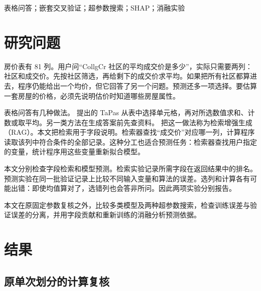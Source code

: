 \documentclass[12pt,journal,onecolumn,a4paper]{IEEEtran}
\begin{document}
\begin{abstract}
TableLab 在本地检索字段说明，通过 DeepSeek API 生成分析方案，再由本机程序完成统计与模型训练。字段检索检查限于 16 道固定题，其中 15 道含英文字段名；DeepSeek API 的方案生成质量尚未评价。本文用房价、收入分类、NBA 得分和学生成绩四个任务比较九种预设方法，并对森林与梯度提升分别进行网格和 TPE 搜索。外层三折评价训练流程，内层三折选择参数；训练与验证曲线检查拟合差距，SHAP 和重新调参的特征组消融检查模型依赖。房价的较小平均 RMSE 为 32,338.23 美元，来自提升树＋网格；收入分类中，提升树＋网格的 AUC 为 0.8913。NBA 得分由随机森林取得较小平均误差（5.698 分），学生成绩则是 Ridge（13.545 分）。各任务的较优方法与搜索收益不同，解释和消融结果也需结合字段之间的替代关系判断。
\end{abstract}
\renewcommand{\IEEEkeywordsname}{关键词}
\begin{IEEEkeywords}表格问答；嵌套交叉验证；超参数搜索；SHAP；消融实验\end{IEEEkeywords}
\clearpage\tableofcontents\clearpage
\section{研究问题}


房价表有 81 列。用户问“CollgCr 社区的平均成交价是多少”，实际只需要两列：社区和成交价。先按社区筛选，再给剩下的成交价求平均。如果把所有社区都算进去，程序仍能给出一个均价，但它回答了另一个问题。预测还多一项选择。要估算一套房屋的价格，必须先说明估价时知道哪些房屋属性。

表格问答有几种做法。\citet{herzig2020} 提出的 TaPas 从表中选择单元格，再对所选数值求和、计数或取平均。另一类方法在生成答案前先查资料。\citet{lewis2020} 把这一做法称为检索增强生成（RAG）。本文把检索用于字段说明。检索器查找“成交价”对应哪一列，计算程序读取该列中符合条件的全部记录。这种分工也适合预测任务：检索器查找用户指定的变量，统计程序用这些变量重新拟合模型。

本文分别检查字段检索和模型预测。检索实验记录所需字段在返回结果中的排名。预测实验在同一批验证记录上比较不同输入变量和算法的误差。选列和计算各有可能出错：即使均值算对了，选错列也会答非所问。因此两项实验分别报告。


本文在原固定参数复核之外，比较多类模型及两种超参数搜索，检查训练误差与验证误差的分离，并用字段贡献和重新训练的消融分析预测依据。
\section{结果}

\subsection{原单次划分的计算复核}
\end{document}

